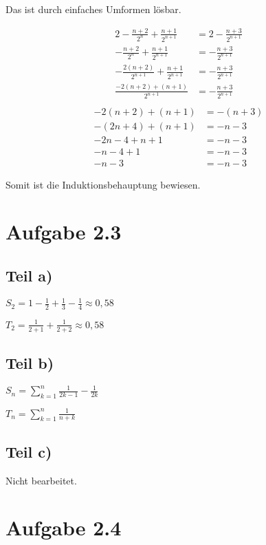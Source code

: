 \documentclass[a4paper,german,12pt]{article}
\begin{document}
Das ist durch einfaches Umformen lösbar.

\begin{align*}
2 - \frac{n+2}{2^n} + \frac{n+1}{2^{n+1}} &= 2 - \frac{n+3}{2^{n+1}} \\
- \frac{n+2}{2^n} + \frac{n+1}{2^{n+1}} &= - \frac{n+3}{2^{n+1}} \\
- \frac{2(n+2)}{2^{n+1}} + \frac{n+1}{2^{n+1}} &= - \frac{n+3}{2^{n+1}} \\
\frac{-2(n+2)+(n+1)}{2^{n+1}} &= - \frac{n+3}{2^{n+1}} \\
\end{align*}
\begin{align*}
-2(n+2)+(n+1) &= - (n+3) \\
-(2n+4)+(n+1) &= -n-3 \\
-2n-4+n+1 &= -n-3 \\
-n-4+1 &= -n-3 \\
-n-3 &= -n-3
\end{align*}

Somit ist die Induktionsbehauptung bewiesen.

\section*{Aufgabe 2.3}

\subsection*{Teil a)}

$S_2 = 1 - \frac{1}{2} + \frac{1}{3} - \frac{1}{4} \approx 0,58$

$T_2 = \frac{1}{2+1} + \frac{1}{2+2} \approx 0,58$

\subsection*{Teil b)}

$S_n = \sum_{k=1}^n \frac{1}{2k-1} - \frac{1}{2k}$

$T_n = \sum_{k=1}^n \frac{1}{n+k}$

\subsection*{Teil c)}

Nicht bearbeitet.

\section*{Aufgabe 2.4}
\end{document}
